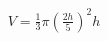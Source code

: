 \documentclass[preview]{standalone}
\begin{document}
\begin{align*}
V = \frac{1}{3} \pi \left(\frac{2h}{5}\right)^2 h
\end{align*}
\end{document}
